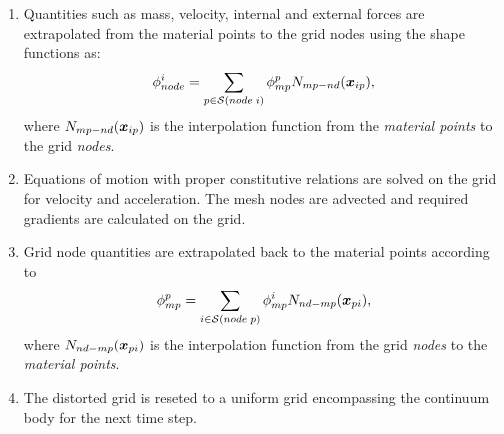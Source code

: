 \begin{enumerate}
	\item  Quantities such as mass, velocity, internal and external forces are extrapolated from the material points to the grid nodes using the shape functions as: 
	\begin{equation}
	\phi^i_{node}=\sum_{p \in {{\mathcal{S}({node\;i})}}} \phi^p_{mp} N_{mp-nd}(\boldsymbol{x}_{ip}),
	\end{equation}
	where $N_{mp-nd}(\boldsymbol{x}_{ip})$ is the interpolation function from the \textit{material points} to the grid \textit{nodes}.
	\item Equations of motion with proper constitutive relations are solved on the grid for velocity and acceleration. The mesh nodes are advected and required gradients are calculated on the grid. 
	\item Grid node quantities are extrapolated back to the material points according to 
	\begin{equation}
	\phi^p_{mp}=\sum_{i \in {{\mathcal{S}({node\;p})}}} \phi^i_{mp} N_{nd-mp}(\boldsymbol{x}_{pi}),
	\end{equation}
	where $N_{nd-mp}(\boldsymbol{x}_{pi})$ is the interpolation function from the grid \textit{nodes} to the \textit{material points}.
	\item The distorted grid is reseted to a uniform grid encompassing the continuum body for the next time step.
\end{enumerate} 


